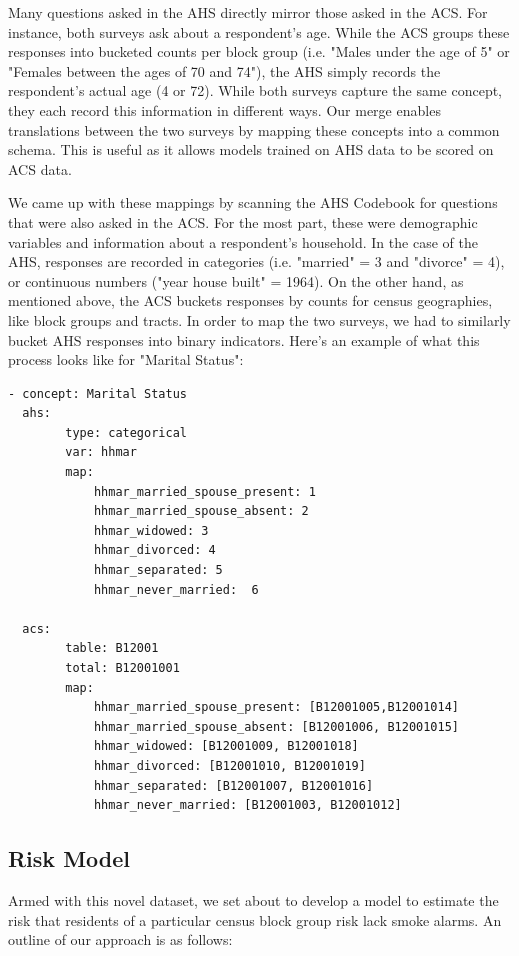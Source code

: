 \documentclass{sig-alternate}
\begin{document}
Many questions asked in the AHS directly mirror those asked in the ACS. For instance, both surveys ask about a respondent's age. While the ACS groups these responses into bucketed counts per block group (i.e. "Males under the age of 5" or "Females between the ages of 70 and 74"), the AHS simply records the respondent's actual age (4 or 72). While both surveys capture the same concept, they each record this information in different ways. Our merge enables translations between the two surveys by mapping these concepts into a common schema. This is useful as it allows models trained on AHS data to be scored on ACS data. 

We came up with these mappings by scanning the AHS Codebook for questions that were also asked in the ACS. For the most part, these were demographic variables and information about a respondent's household. In the case of the AHS, responses are recorded in categories (i.e. "married" = 3 and "divorce" = 4), or continuous numbers ("year house built" = 1964). On the other hand, as mentioned above, the ACS buckets responses by counts for census geographies, like block groups and tracts. In order to map the two surveys, we had to similarly bucket AHS responses into binary indicators. Here's an example of what this process looks like for "Marital Status":
\begin{verbatim}
- concept: Marital Status 
  ahs:
        type: categorical
        var: hhmar 
        map:
            hhmar_married_spouse_present: 1
            hhmar_married_spouse_absent: 2
            hhmar_widowed: 3
            hhmar_divorced: 4
            hhmar_separated: 5
            hhmar_never_married:  6

  acs:
        table: B12001
        total: B12001001
        map:
            hhmar_married_spouse_present: [B12001005,B12001014]
            hhmar_married_spouse_absent: [B12001006, B12001015]
            hhmar_widowed: [B12001009, B12001018]
            hhmar_divorced: [B12001010, B12001019]
            hhmar_separated: [B12001007, B12001016]
            hhmar_never_married: [B12001003, B12001012]
\end{verbatim}

\subsection{Risk Model}

Armed with this novel dataset, we set about to develop a model to estimate the risk that residents of a particular census block group risk lack smoke alarms.  An outline of our approach is as follows:
\end{document}
